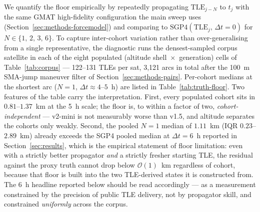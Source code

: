 \documentclass[10pt, letterpaper]{article}
\begin{document}
We quantify the floor empirically by repeatedly propagating
$\mathrm{TLE}_{j-N}$ to $t_{j}$ with the same GMAT high-fidelity
configuration the main sweep uses (Section~\ref{sec:methods-forcemodel})
and comparing to $\mathrm{SGP4}(\mathrm{TLE}_{j},\,\Delta t = 0)$
for $N \in \{1,\,2,\,3,\,6\}$. To capture inter-cohort variation
rather than over-generalising from a single representative, the
diagnostic runs the densest-sampled corpus satellite in each of the
eight populated (altitude shell~$\times$~generation) cells of
Table~\ref{tab:corpus} --- 122--131 TLEs per sat, 3{,}121 arcs in
total after the 100~m SMA-jump maneuver filter of
Section~\ref{sec:methods-pairs}. Per-cohort medians at the shortest
arc ($N = 1$, $\Delta t \approx 4$--$5$~h) are listed in
Table~\ref{tab:truth-floor}. Two features of the table carry the
interpretation. First, every populated cohort sits in $0.81$--$1.37$~km
at the 5~h scale; the floor is, to within a factor of two,
\emph{cohort-independent} --- v2-mini is not measurably worse than
v1.5, and altitude separates the cohorts only weakly. Second, the
pooled $N = 1$ median of $1.11$~km (IQR $0.23$--$2.89$~km) already
exceeds the SGP4 pooled median at $\Delta t = 6$~h reported in
Section~\ref{sec:results}, which is the empirical statement of
floor limitation: even with a strictly better propagator
\emph{and} a strictly fresher starting TLE, the residual against
the proxy truth cannot drop below $\mathcal{O}(1)$~km regardless
of cohort, because that floor is built into the two TLE-derived
states it is constructed from. The 6~h headline reported below
should be read accordingly --- as a measurement constrained by the
precision of public TLE delivery, not by propagator skill, and
constrained \emph{uniformly} across the corpus.
\end{document}
